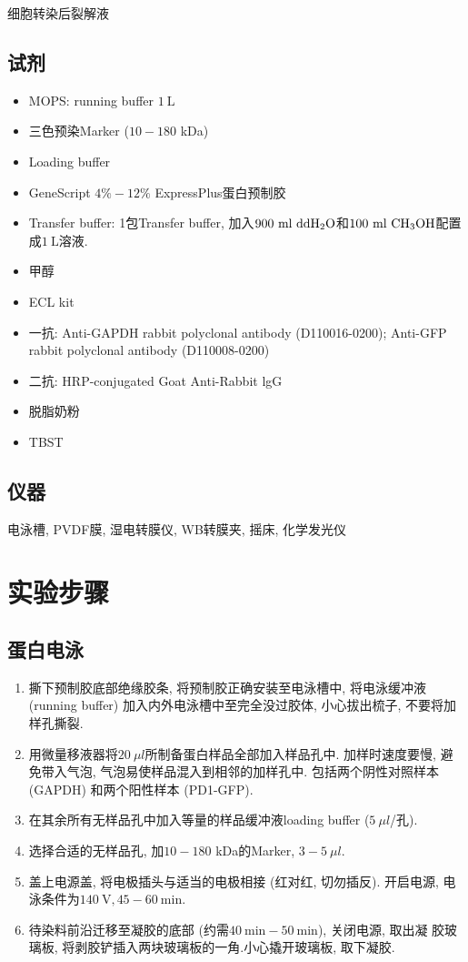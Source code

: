 \documentclass{article}
\begin{document}
细胞转染后裂解液

\subsection{试剂}

\begin{itemize}
    \item MOPS: running buffer $1\ \mbox{L}$
    \item 三色预染Marker ($10-180$ kDa)
    \item Loading buffer
    \item GeneScript $4\%-12\%$ ExpressPlus蛋白预制胶
    \item Transfer buffer: 1包Transfer buffer, 加入$900\ \mbox{ml}\ \mbox{dd}\ce{H2O}$和$100\ \mbox{ml}\ \ce{CH3OH}$配置成$1\ \mbox{L}$溶液.
    \item 甲醇
    \item ECL kit
    \item 一抗: Anti-GAPDH rabbit polyclonal antibody (D110016-0200); Anti-GFP rabbit polyclonal antibody (D110008-0200)
    \item 二抗: HRP-conjugated Goat Anti-Rabbit lgG
    \item 脱脂奶粉
    \item TBST
\end{itemize}

\subsection{仪器}

电泳槽, PVDF膜, 湿电转膜仪, WB转膜夹, 摇床, 化学发光仪

\section{实验步骤}

\subsection{蛋白电泳}

\begin{enumerate}
    \item 撕下预制胶底部绝缘胶条, 将预制胶正确安装至电泳槽中, 将电泳缓冲液 (running buffer) 加入内外电泳槽中至完全没过胶体, 小心拔出梳子, 不要将加样孔撕裂.
    \item 用微量移液器将$20\ \mu l$所制备蛋白样品全部加入样品孔中. 加样时速度要慢, 避免带入气泡, 气泡易使样品混入到相邻的加样孔中. 包括两个阴性对照样本 (GAPDH) 和两个阳性样本 (PD1-GFP).
    \item 在其余所有无样品孔中加入等量的样品缓冲液loading buffer ($5\ \mu l$/孔).
    \item 选择合适的无样品孔, 加$10-180$ kDa的Marker, $3-5\ \mu l$.
    \item 盖上电源盖, 将电极插头与适当的电极相接 (红对红, 切勿插反). 开启电源, 电泳条件为$140\ \mbox{V}, 45-60\ \mbox{min}$.
    \item 待染料前沿迁移至凝胶的底部 (约需$40\ \mbox{min}-50\ \mbox{min}$), 关闭电源, 取出凝    胶玻璃板, 将剥胶铲插入两块玻璃板的一角.小心撬开玻璃板, 取下凝胶.
\end{enumerate}
\end{document}

